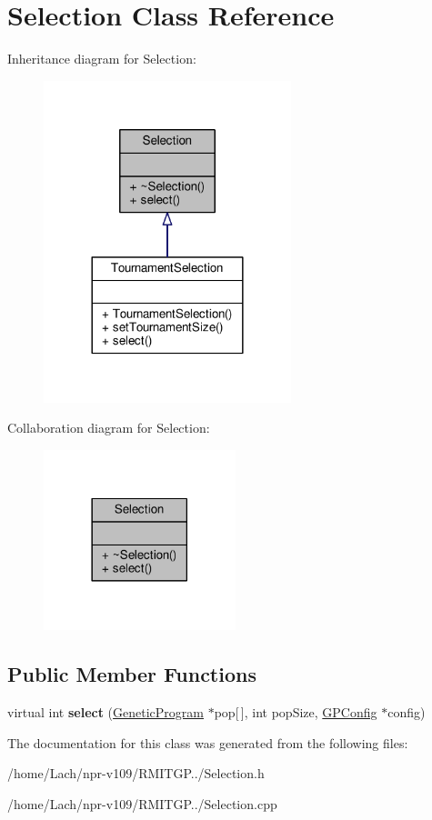 \hypertarget{classSelection}{}\section{Selection Class Reference}
\label{classSelection}


Inheritance diagram for Selection\+:
\nopagebreak
\begin{figure}[H]
\begin{center}
\leavevmode
\includegraphics[width=204pt]{classSelection__inherit__graph}
\end{center}
\end{figure}


Collaboration diagram for Selection\+:
\nopagebreak
\begin{figure}[H]
\begin{center}
\leavevmode
\includegraphics[width=158pt]{classSelection__coll__graph}
\end{center}
\end{figure}
\subsection*{Public Member Functions}
\begin{DoxyCompactItemize}
\item 
\hypertarget{classSelection_a99c30b3a21afca58d2cedde065d1cc47}{}\label{classSelection_a99c30b3a21afca58d2cedde065d1cc47} 
virtual int {\bfseries select} (\hyperlink{classGeneticProgram}{Genetic\+Program} $\ast$pop\mbox{[}$\,$\mbox{]}, int pop\+Size, \hyperlink{classGPConfig}{G\+P\+Config} $\ast$config)
\end{DoxyCompactItemize}


The documentation for this class was generated from the following files\+:\begin{DoxyCompactItemize}
\item 
/home/\+Lach/npr-\/v109/\+R\+M\+I\+T\+G\+P../Selection.\+h\item 
/home/\+Lach/npr-\/v109/\+R\+M\+I\+T\+G\+P../Selection.\+cpp\end{DoxyCompactItemize}
